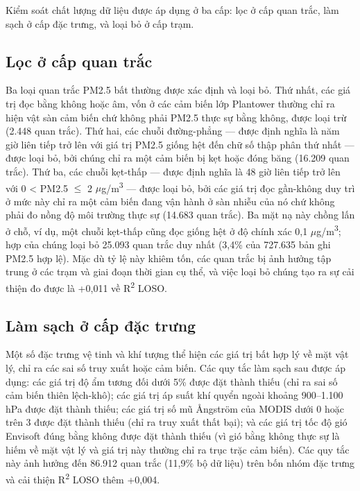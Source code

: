 Kiểm soát chất lượng dữ liệu được áp dụng ở ba cấp: lọc ở cấp quan trắc, làm sạch ở cấp đặc trưng, và loại bỏ ở cấp trạm.

\subsection{Lọc ở cấp quan trắc}

Ba loại quan trắc PM2.5 bất thường được xác định và loại bỏ. Thứ nhất, các giá trị đọc bằng không hoặc âm, vốn ở các cảm biến lớp Plantower thường chỉ ra hiện vật sàn cảm biến chứ không phải PM2.5 thực sự bằng không, được loại trừ (2.448 quan trắc). Thứ hai, các chuỗi đường-phẳng --- được định nghĩa là năm giờ liên tiếp trở lên với giá trị PM2.5 giống hệt đến chữ số thập phân thứ nhất --- được loại bỏ, bởi chúng chỉ ra một cảm biến bị kẹt hoặc đóng băng (16.209 quan trắc). Thứ ba, các chuỗi kẹt-thấp --- được định nghĩa là 48 giờ liên tiếp trở lên với 0 < PM2.5 $\leq$ 2 $\mu$g/m\textsuperscript{3} --- được loại bỏ, bởi các giá trị đọc gần-không duy trì ở mức này chỉ ra một cảm biến đang vận hành ở sàn nhiễu của nó chứ không phải đo nồng độ môi trường thực sự (14.683 quan trắc). Ba mặt nạ này chồng lấn ở chỗ, ví dụ, một chuỗi kẹt-thấp cũng đọc giống hệt ở độ chính xác 0,1 $\mu$g/m\textsuperscript{3}; hợp của chúng loại bỏ 25.093 quan trắc duy nhất (3,4\% của 727.635 bản ghi PM2.5 hợp lệ). Mặc dù tỷ lệ này khiêm tốn, các quan trắc bị ảnh hưởng tập trung ở các trạm và giai đoạn thời gian cụ thể, và việc loại bỏ chúng tạo ra sự cải thiện đo được là +0,011 về R\textsuperscript{2} LOSO.

\subsection{Làm sạch ở cấp đặc trưng}

Một số đặc trưng vệ tinh và khí tượng thể hiện các giá trị bất hợp lý về mặt vật lý, chỉ ra các sai số truy xuất hoặc cảm biến. Các quy tắc làm sạch sau được áp dụng: các giá trị độ ẩm tương đối dưới 5\% được đặt thành thiếu (chỉ ra sai số cảm biến thiên lệch-khô); các giá trị áp suất khí quyển ngoài khoảng 900--1.100 hPa được đặt thành thiếu; các giá trị số mũ Ångström của MODIS dưới 0 hoặc trên 3 được đặt thành thiếu (chỉ ra truy xuất thất bại); và các giá trị tốc độ gió Envisoft đúng bằng không được đặt thành thiếu (vì gió bằng không thực sự là hiếm về mặt vật lý và giá trị này thường chỉ ra trục trặc cảm biến). Các quy tắc này ảnh hưởng đến 86.912 quan trắc (11,9\% bộ dữ liệu) trên bốn nhóm đặc trưng và cải thiện R\textsuperscript{2} LOSO thêm +0,004.

